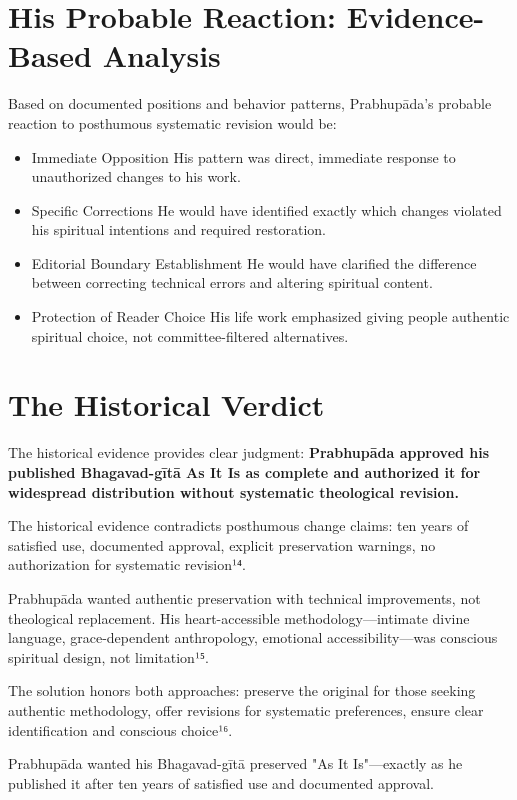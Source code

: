 \documentclass[11pt,twoside]{book}
\begin{document}
\section*{His Probable Reaction: Evidence-Based Analysis}
\label{sec:org70c7176}

Based on documented positions and behavior patterns, Prabhupāda's probable reaction to posthumous systematic revision would be:
\begin{itemize}
\item Immediate Opposition
\label{sec:orgf9300be}
His pattern was direct, immediate response to unauthorized changes to his work.
\item Specific Corrections
\label{sec:orgb4c9f26}
He would have identified exactly which changes violated his spiritual intentions and required restoration.
\item Editorial Boundary Establishment
\label{sec:org82d2128}
He would have clarified the difference between correcting technical errors and altering spiritual content.
\item Protection of Reader Choice
\label{sec:org7533b40}
His life work emphasized giving people authentic spiritual choice, not committee-filtered alternatives.
\end{itemize}
\section*{The Historical Verdict}
\label{sec:org17fcdab}

The historical evidence provides clear judgment: \textbf{\textbf{Prabhupāda approved his published Bhagavad-gītā As It Is as complete and authorized it for widespread distribution without systematic theological revision.}}

The historical evidence contradicts posthumous change claims: ten years of satisfied use, documented approval, explicit preservation warnings, no authorization for systematic revision¹⁴.

Prabhupāda wanted authentic preservation with technical improvements, not theological replacement. His heart-accessible methodology—intimate divine language, grace-dependent anthropology, emotional accessibility—was conscious spiritual design, not limitation¹⁵.

The solution honors both approaches: preserve the original for those seeking authentic methodology, offer revisions for systematic preferences, ensure clear identification and conscious choice¹⁶.

Prabhupāda wanted his Bhagavad-gītā preserved "As It Is"—exactly as he published it after ten years of satisfied use and documented approval.
\end{document}
